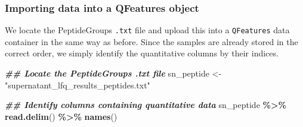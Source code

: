 \documentclass[9pt,a4paper,]{extarticle}
\newenvironment{Shaded}{\begin{snugshade}}{\end{snugshade}}
\newcommand{\DocumentationTok}[1]{\textcolor[rgb]{0.56,0.35,0.01}{\textbf{\textit{#1}}}}
\newcommand{\FunctionTok}[1]{\textcolor[rgb]{0.13,0.29,0.53}{\textbf{#1}}}
\newcommand{\NormalTok}[1]{#1}
\newcommand{\OtherTok}[1]{\textcolor[rgb]{0.56,0.35,0.01}{#1}}
\newcommand{\SpecialCharTok}[1]{\textcolor[rgb]{0.81,0.36,0.00}{\textbf{#1}}}
\newcommand{\StringTok}[1]{\textcolor[rgb]{0.31,0.60,0.02}{#1}}
\begin{document}
\hypertarget{importing-data-into-a-qfeatures-object}{%
\subsubsection{Importing data into a QFeatures object}\label{importing-data-into-a-qfeatures-object}}

We locate the PeptideGroups \texttt{.txt} file and upload this into a \texttt{QFeatures} data
container in the same way as before. Since the samples are already stored in the
correct order, we simply identify the quantitative columns by their indices.

\begin{Shaded}
\begin{Highlighting}[]
\DocumentationTok{\#\# Locate the PeptideGroups .txt file}
\NormalTok{sn\_peptide }\OtherTok{\textless{}{-}} \StringTok{"supernatant\_lfq\_results\_peptides.txt"}

\DocumentationTok{\#\# Identify columns containing quantitative data}
\NormalTok{sn\_peptide }\SpecialCharTok{\%\textgreater{}\%}
  \FunctionTok{read.delim}\NormalTok{() }\SpecialCharTok{\%\textgreater{}\%}
  \FunctionTok{names}\NormalTok{()}
\end{Highlighting}
\end{Shaded}
\end{document}
